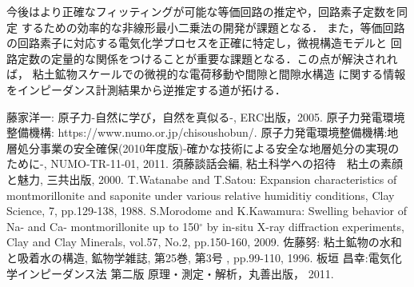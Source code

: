 ﻿\documentclass[11pt,a4j]{mybook2}
\begin{document}
今後はより正確なフィッティングが可能な等価回路の推定や，回路素子定数を同定
するための効率的な非線形最小二乗法の開発が課題となる．
また，等価回路の回路素子に対応する電気化学プロセスを正確に特定し，微視構造モデルと
回路定数の定量的な関係をつけることが重要な課題となる．この点が解決されれば，
粘土鉱物スケールでの微視的な電荷移動や間隙と間隙水構造
に関する情報をインピーダンス計測結果から逆推定する道が拓ける．
\renewcommand{\bibname}{参考文献}
\begin{thebibliography}{99}
	藤家洋一: 原子力-自然に学び，自然を真似る-, ERC出版，2005.
	原子力発電環境整備機構: https://www.numo.or.jp/chisoushobun/.
	原子力発電環境整備機構:地層処分事業の安全確保(2010年度版)-確かな技術による安全な地層処分の実現のために-, NUMO-TR-11-01, 2011.
	須藤談話会編, 粘土科学への招待　粘土の素顔と魅力, 三共出版, 2000.
	T.Watanabe and T.Satou: Expansion characteristics of montmorillonite and saponite under various 
	relative humiditiy conditions, Clay Science, 7, pp.129-138, 1988.
	S.Morodome and K.Kawamura: Swelling behavior of Na- and Ca- montmorillonite up to 150$^\circ$ by in-situ 
	X-ray diffraction experiments, Clay and Clay Minerals, vol.57, No.2, pp.150-160, 2009.
	佐藤努: 粘土鉱物の水和と吸着水の構造, 鉱物学雑誌, 第25巻, 第3号 , pp.99-110, 1996.
	板垣 昌幸:電気化学インピーダンス法 第二版 原理・測定・解析，丸善出版， 2011. 
\end{thebibliography}
\end{document}
